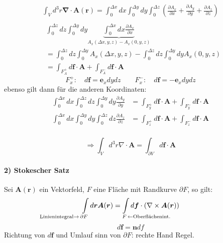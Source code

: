 \documentclass[titlepage,11pt,a4paper,ngerman]{report}
\newcommand{\ub}[1]{\underbrace{#1}}
\renewcommand{\vec}[1]{\boldsymbol{#1}}
\begin{document}
\begin{enumerate}[i)]
	\begin{align*}
	\int_V d^3r \vec{\nabla} \cdot \vec{A}(\vec{r})  =  \int_{0}^{\Delta x} dx \int_{0}^{\Delta y} dy \int_{0}^{\Delta z} \left(\frac{\partial A_x}{\partial x} + \frac{\partial A_y}{\partial y} + \frac{\partial A_z}{\partial z}\right)  \\
	\end{align*}
	\begin{align*}
	&\int_{0}^{\Delta z} dz \int_{0}^{\Delta y} dy \ub{\int_{0}^{\Delta x} dx \frac{\partial A_x}{\partial x}}_{A_x(\Delta x , y , z) - A_x(0,y,z)}\\
	& = \int_{0}^{\Delta z} dz \int_{0}^{\Delta y} A_x(\Delta x,y,z) - \int_{0}^{\Delta z} dz \int_{0}^{\Delta y} dy A_x(0,y,z)\\
	& = \int_{F^+_A} d\vec{f} \cdot \vec{A} + \int_{F^-_A} d\vec{f} \cdot \vec{A}
	\end{align*}
	\begin{equation*}
	F_x^+: \quad d\vec{f} = \vec{e}_x dy dz \qquad F_x^-: \quad d\vec{f} = - \vec{e}_x dy dz
	\end{equation*}
	ebenso gilt dann für die anderen Koordinaten:
	\begin{align*}
	\int_{0}^{\Delta x} dx \int_{0}^{\Delta z} dz \int_{0}^{\Delta y} dy \frac{\partial A_y}{\partial y} &= \int_{F^+_y} d\vec{f} \cdot \vec{A} + \int_{F^-_y} d\vec{f} \cdot \vec{A} \\
	\int_{0}^{\Delta x} dx \int_{0}^{\Delta y} dy \int_{0}^{\Delta z} dz \frac{\partial A_z}{\partial z} &= \int_{F^+_z} d\vec{f} \cdot \vec{A} + \int_{F^-_z} d\vec{f} \cdot \vec{A} \\
	\end{align*}
\end{enumerate}

$$\Rightarrow \int_V d^3 r \nabla \cdot \vec{A} = \int_{\partial V} d \vec{f} \cdot \vec{A}$$

\paragraph{2) Stokescher Satz}
Sei $\vec{A}(\vec{r})$ ein Vektorfeld, $F$ eine Fläche mit Randkurve $\partial F$, so gilt:
$$\int\limits_{\mathclap{\textrm{Linienintegral}\rightarrow\,\partial F \phantom{\textrm{Linienintegral}\rightarrow\,}}} d\vec{r} \vec{A}(\vec{r}) = \int\limits_{\mathclap{\phantom{\, \leftarrow \textrm{Oberflächenint.}} F\, \leftarrow \textrm{Oberflächenint.}}} d \vec{f} \cdot (\nabla \times \vec{A}(\vec{r}))$$
$$d\vec{f} = \vec{n} df$$
Richtung von $d\vec{f}$ und Umlauf sinn von $\partial F$: rechte Hand Regel.
\end{document}
